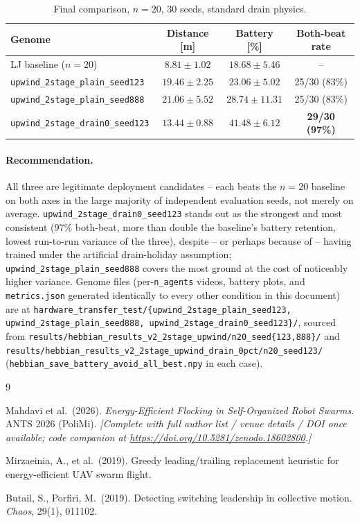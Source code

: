 \documentclass[11pt]{article}
\begin{document}
\begin{table}[h]
\centering
\caption{Final comparison, $n{=}20$, 30 seeds, standard drain physics.}
\label{tab:beat-baseline-final}
\begin{tabular}{@{}lccc@{}}
\toprule
Genome & Distance [m] & Battery [\%] & Both-beat rate \\
\midrule
LJ baseline ($n{=}20$) & $8.81 \pm 1.02$ & $18.68 \pm 5.46$ & -- \\
\texttt{upwind\_2stage\_plain\_seed123} & $19.46 \pm 2.25$ & $23.06 \pm 5.02$ & 25/30 (83\%) \\
\texttt{upwind\_2stage\_plain\_seed888} & $21.06 \pm 5.52$ & $28.74 \pm 11.31$ & 25/30 (83\%) \\
\texttt{upwind\_2stage\_drain0\_seed123} & $\mathbf{13.44 \pm 0.88}$ & $\mathbf{41.48 \pm 6.12}$ & \textbf{29/30 (97\%)} \\
\bottomrule
\end{tabular}
\end{table}

\paragraph{Recommendation.} All three are legitimate deployment candidates -- each beats the
$n{=}20$ baseline on both axes in the large majority of independent evaluation seeds, not merely
on average. \texttt{upwind\_2stage\_drain0\_seed123} stands out as the strongest and most
consistent (97\% both-beat, more than double the baseline's battery retention, lowest
run-to-run variance of the three), despite -- or perhaps because of -- having trained under the
artificial drain-holiday assumption; \texttt{upwind\_2stage\_plain\_seed888} covers the most
ground at the cost of noticeably higher variance. Genome files (per-\texttt{n\_agents} videos,
battery plots, and \texttt{metrics.json} generated identically to every other condition in this
document) are at
\texttt{hardware\_transfer\_test/\{upwind\_2stage\_plain\_seed123, upwind\_2stage\_plain\_seed888,
upwind\_2stage\_drain0\_seed123\}/}, sourced from
\texttt{results/hebbian\_results\_v2\_2stage\_upwind/n20\_seed\{123,888\}/} and
\texttt{results/hebbian\_results\_v2\_2stage\_upwind\_drain\_0pct/n20\_seed123/}
(\texttt{hebbian\_save\_battery\_avoid\_all\_best.npy} in each case).

\clearpage
\begin{thebibliography}{9}

Mahdavi et al.\ (2026). \emph{Energy-Efficient Flocking in Self-Organized Robot Swarms}. ANTS
2026 (PoliMi). \emph{[Complete with full author list / venue details / DOI once available; code
companion at \url{https://doi.org/10.5281/zenodo.18602800}.]}

Mirzaeinia, A., et al.\ (2019). Greedy leading/trailing replacement heuristic for
energy-efficient UAV swarm flight.

Butail, S., Porfiri, M.\ (2019). Detecting switching leadership in collective motion.
\emph{Chaos}, 29(1), 011102.

\end{thebibliography}
\end{document}
